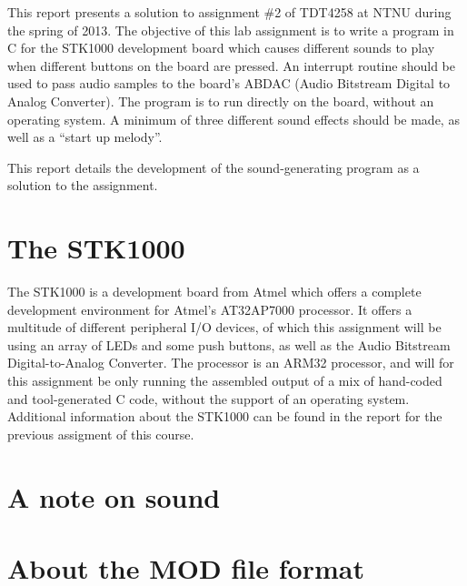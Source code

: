 This report presents a solution to assignment \#2 of TDT4258 at NTNU during the spring of 2013.
The objective of this lab assignment is to write a program in C for the STK1000 development board which causes different sounds to play when different buttons on the board are pressed.
An interrupt routine should be used to pass audio samples to the board's ABDAC (Audio Bitstream Digital to Analog Converter).
The program is to run directly on the board, without an operating system.
A minimum of three different sound effects should be made, as well as a ``start up melody''.

This report details the development of the sound-generating program as a solution to the assignment.

\section{The STK1000}
	The STK1000 is a development board from Atmel which offers a complete development environment for Atmel's AT32AP7000 processor.
	It offers a multitude of different peripheral I/O devices, of which this assignment will be using an array of LEDs and some push buttons, as well as the Audio Bitstream Digital-to-Analog Converter.
	The processor is an ARM32 processor, and will for this assignment be only running the assembled output of a mix of hand-coded and tool-generated C code, without the support of an operating system.
    Additional information about the STK1000 can be found in the report for the previous assigment of this course.\cite{tdt4258-1}

\section{A note on sound}
	


\section{About the MOD file format}
	
